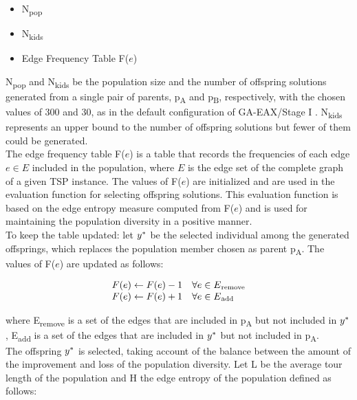 \begin{itemize}
\item N\textsubscript{pop}
\item N\textsubscript{kids}
\item Edge Frequency Table F($e$)
\end{itemize}
N\textsubscript{pop} and N\textsubscript{kids} be the population size and the number of offspring solutions generated from a single pair of parents, p\textsubscript{A} and p\textsubscript{B}, respectively, with the chosen values of 300 and 30, as in the default configuration of GA-EAX/Stage I \cite{Nagata2013}. N\textsubscript{kids} represents an upper bound to the number of offspring solutions but fewer of them could be generated. \\
The edge frequency table F($e$) is a table that records the frequencies of each edge $e \in E$ included in the population, where $E$ is the edge set of the complete graph of a given TSP instance. The values of F($e$) are initialized and are used in the evaluation function for selecting offspring solutions. This evaluation function is based on the edge entropy measure computed from F($e$) and is used for maintaining the population diversity in a positive manner. \\
To keep the table updated: let $y\ssymbol{1}$ be the selected individual among the generated offsprings, which replaces the population member chosen as parent p\textsubscript{A}. The values of F($e$) are updated as follows: 

\begin{equation}\begin{array}{ll}
F(e) \leftarrow F(e)-1 & \forall e \in E\textsubscript{remove} \\
F(e) \leftarrow F(e)+1 & \forall e \in E\textsubscript{add}
\end{array}\end{equation}

where E\textsubscript{remove} is a set of the edges that are included in p\textsubscript{A} but not included in $y\ssymbol{1}$, E\textsubscript{add} is a set of the edges that are included in $y\ssymbol{1}$ but not included in p\textsubscript{A}. \\

The offspring $y\ssymbol{1}$ is selected, taking account of the balance between the amount of the improvement and loss of the population diversity. Let L be the average tour length of the population and H the edge entropy of the population defined as follows:

